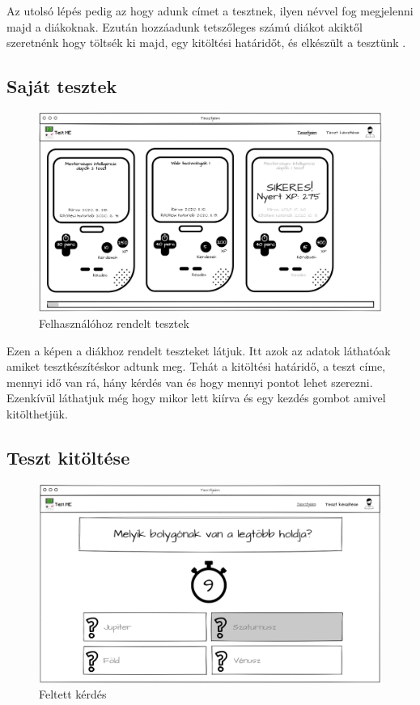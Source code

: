 Az utolsó lépés pedig az hogy adunk címet a tesztnek, ilyen névvel fog megjelenni majd a diákoknak. Ezután hozzáadunk tetszőleges számú diákot akiktől szeretnénk hogy töltsék ki majd, egy kitöltési határidőt, és elkészült a tesztünk .

\subsection{Saját tesztek}
\begin{figure}[H]
    \centering
    \includegraphics[width=\linewidth]{images/my_tests_wireframe.png}
    \caption{Felhasználóhoz rendelt tesztek}
    \label{fig:my_tests}
\end{figure}

Ezen a képen  a diákhoz rendelt teszteket látjuk. Itt azok az adatok láthatóak amiket tesztkészítéskor adtunk meg. Tehát a kitöltési határidő, a teszt címe, mennyi idő van rá, hány kérdés van és hogy mennyi pontot lehet szerezni. Ezenkívül láthatjuk még hogy mikor lett kiírva és egy kezdés gombot amivel kitölthetjük.

\subsection{Teszt kitöltése}

\begin{figure}[H]
    \centering
    \includegraphics[width=\linewidth]{images/test1_wireframe.png}
    \caption{Feltett kérdés}
    \label{fig:test_question}
\end{figure}

